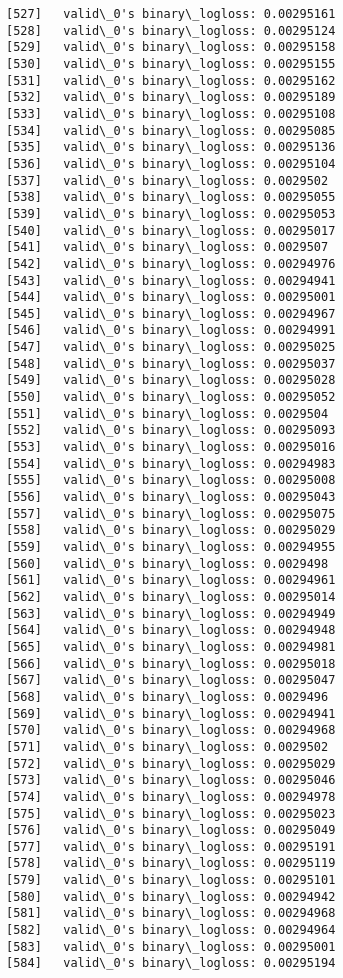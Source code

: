 \documentclass[11pt]{article}
\begin{document}
\begin{Verbatim}[commandchars=\\\{\}]
[527]	valid\_0's binary\_logloss: 0.00295161
[528]	valid\_0's binary\_logloss: 0.00295124
[529]	valid\_0's binary\_logloss: 0.00295158
[530]	valid\_0's binary\_logloss: 0.00295155
[531]	valid\_0's binary\_logloss: 0.00295162
[532]	valid\_0's binary\_logloss: 0.00295189
[533]	valid\_0's binary\_logloss: 0.00295108
[534]	valid\_0's binary\_logloss: 0.00295085
[535]	valid\_0's binary\_logloss: 0.00295136
[536]	valid\_0's binary\_logloss: 0.00295104
[537]	valid\_0's binary\_logloss: 0.0029502
[538]	valid\_0's binary\_logloss: 0.00295055
[539]	valid\_0's binary\_logloss: 0.00295053
[540]	valid\_0's binary\_logloss: 0.00295017
[541]	valid\_0's binary\_logloss: 0.0029507
[542]	valid\_0's binary\_logloss: 0.00294976
[543]	valid\_0's binary\_logloss: 0.00294941
[544]	valid\_0's binary\_logloss: 0.00295001
[545]	valid\_0's binary\_logloss: 0.00294967
[546]	valid\_0's binary\_logloss: 0.00294991
[547]	valid\_0's binary\_logloss: 0.00295025
[548]	valid\_0's binary\_logloss: 0.00295037
[549]	valid\_0's binary\_logloss: 0.00295028
[550]	valid\_0's binary\_logloss: 0.00295052
[551]	valid\_0's binary\_logloss: 0.0029504
[552]	valid\_0's binary\_logloss: 0.00295093
[553]	valid\_0's binary\_logloss: 0.00295016
[554]	valid\_0's binary\_logloss: 0.00294983
[555]	valid\_0's binary\_logloss: 0.00295008
[556]	valid\_0's binary\_logloss: 0.00295043
[557]	valid\_0's binary\_logloss: 0.00295075
[558]	valid\_0's binary\_logloss: 0.00295029
[559]	valid\_0's binary\_logloss: 0.00294955
[560]	valid\_0's binary\_logloss: 0.0029498
[561]	valid\_0's binary\_logloss: 0.00294961
[562]	valid\_0's binary\_logloss: 0.00295014
[563]	valid\_0's binary\_logloss: 0.00294949
[564]	valid\_0's binary\_logloss: 0.00294948
[565]	valid\_0's binary\_logloss: 0.00294981
[566]	valid\_0's binary\_logloss: 0.00295018
[567]	valid\_0's binary\_logloss: 0.00295047
[568]	valid\_0's binary\_logloss: 0.0029496
[569]	valid\_0's binary\_logloss: 0.00294941
[570]	valid\_0's binary\_logloss: 0.00294968
[571]	valid\_0's binary\_logloss: 0.0029502
[572]	valid\_0's binary\_logloss: 0.00295029
[573]	valid\_0's binary\_logloss: 0.00295046
[574]	valid\_0's binary\_logloss: 0.00294978
[575]	valid\_0's binary\_logloss: 0.00295023
[576]	valid\_0's binary\_logloss: 0.00295049
[577]	valid\_0's binary\_logloss: 0.00295191
[578]	valid\_0's binary\_logloss: 0.00295119
[579]	valid\_0's binary\_logloss: 0.00295101
[580]	valid\_0's binary\_logloss: 0.00294942
[581]	valid\_0's binary\_logloss: 0.00294968
[582]	valid\_0's binary\_logloss: 0.00294964
[583]	valid\_0's binary\_logloss: 0.00295001
[584]	valid\_0's binary\_logloss: 0.00295194

\end{Verbatim}
\end{document}
